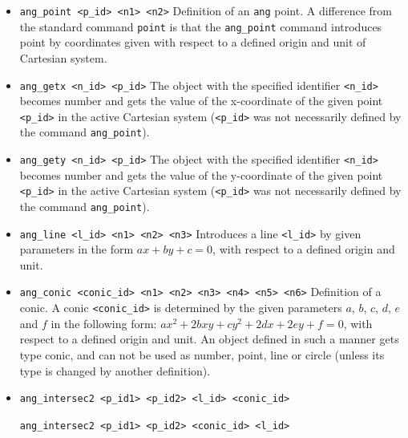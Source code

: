 \documentclass[a4paper]{book}
\begin{document}
\begin{itemize}
\item
\verb|ang_point <p_id> <n1> <n2>|
        Definition of an \verb|ang| point. A difference from the standard
        command \verb|point| is that the \verb|ang_point| command introduces
        point by coordinates given with respect to a defined origin and
        unit of Cartesian system.


\item
\verb|ang_getx <n_id> <p_id>|
        The object with the specified identifier \verb|<n_id>| becomes
        {\sc number} and gets the value of the x-coordinate of the
        given point \verb|<p_id>| in the active Cartesian system (\verb|<p_id>|
        was not necessarily defined by the command \verb|ang_point|).


\item
\verb|ang_gety <n_id> <p_id>|
        The object with the specified identifier \verb|<n_id>| becomes
        {\sc number} and gets the value of the y-coordinate of the
        given point \verb|<p_id>| in the active Cartesian system (\verb|<p_id>|
        was not necessarily defined by the command \verb|ang_point|).


\item
\verb|ang_line <l_id> <n1> <n2> <n3>|
        Introduces a line \verb|<l_id>| by given parameters
        in the form $ax+by+c=0$, with respect to a defined origin and unit.

\item
\verb|ang_conic <conic_id> <n1> <n2> <n3> <n4> <n5> <n6>|
        Definition of a conic. A conic \verb|<conic_id>| is
        determined by the given parameters $a$, $b$, $c$, $d$, $e$ and $f$
        in the following form: $ax^2+2bxy+cy^2+2dx+2ey+f=0$, with respect
        to a defined origin and unit.
        An object defined in such a manner gets type {\sc conic}, and can not
        be used as {\sc number}, {\sc point}, {\sc line} or {\sc circle}
        (unless its type is changed by another definition).

\item
\verb|ang_intersec2 <p_id1> <p_id2> <l_id> <conic_id>|

\verb|ang_intersec2 <p_id1> <p_id2> <conic_id> <l_id>|


\end{itemize}
\end{document}
